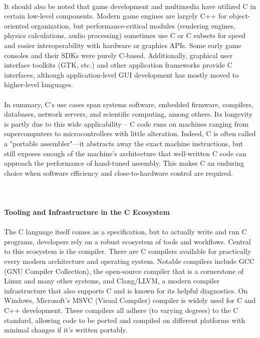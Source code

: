 \documentclass{article}
\begin{document}
\\
{\normalsize It should also be noted that game development and multimedia have utilized C in certain low-level components. Mod}{\normalsize ern game engines are largely C++ for object-oriented organization, but performance-critical modules (rendering engines, physics calculations, audio processing) sometimes use C or C subsets for speed and easier interoperability with hardware or graphics API}{\normalsize s. Some early game consoles and their SDKs were purely C-based. Additionally, graphical user interface toolkits (GTK, etc.) and other application frameworks provide C interfaces, although application-level GUI development has mostly moved to higher-level l}{\normalsize anguages.}\\
\\
{\normalsize In summary, C's use cases span systems software, embedded firmware, compilers, databases, network servers, and scientific computing, among others. Its longevity is partly due to this wide applicability – C code runs on machines ranging from }{\normalsize supercomputers to microcontrollers with little alteration. Indeed, C is often called a "portable assembler"—it abstracts away the exact machine instructions, but still exposes enough of the machine's architecture that well-written C code can approach the p}{\normalsize erformance of hand-tuned assembly. This makes C an enduring choice when software efficiency and close-to-hardware control are required.}\\
\\
\\
\\
{\Large \textbf{Tooling and Infrastructure in the C Ecosystem}}\\
\\
{\normalsize The C language itself comes as a specification, but to actually write an}{\normalsize d run C programs, developers rely on a robust ecosystem of tools and workflows. Central to this ecosystem is the compiler. There are C compilers available for practically every modern architecture and operating system. Notable compilers include GCC (GNU Co}{\normalsize mpiler Collection), the open-source compiler that is a cornerstone of Linux and many other systems, and Clang/LLVM, a modern compiler infrastructure that also supports C and is known for its helpful diagnostics. On Windows, Microsoft's MSVC (Visual Compile}{\normalsize r) compiler is widely used for C and C++ development. These compilers all adhere (to varying degrees) to the C standard, allowing code to be ported and compiled on different platforms with minimal changes if it's written portably.}\\
\end{document}
